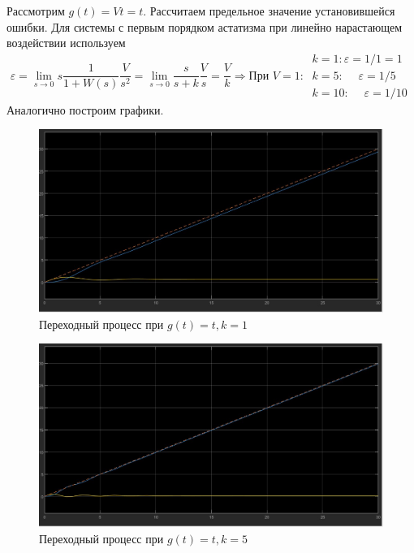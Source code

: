 \documentclass[a4paper, 12pt]{article}
\begin{document}
    Рассмотрим $g(t)=Vt=t$. Рассчитаем предельное значение установившейся ошибки.
    Для системы с первым порядком астатизма при линейно нарастающем воздействии используем
    $$\varepsilon=\lim\limits_{s\rightarrow0}s\dfrac{1}{1+W(s)}\dfrac{V}{s^2}=\lim\limits_{s\rightarrow0}\dfrac{s}{s+k}\dfrac{V}{s}=\dfrac{V}{k}
    \Rightarrow\text{При } V=1:\ \begin{matrix}
        k=1:\varepsilon=1/1=1\\
        k=5:\ \ \ \ \ \,\varepsilon=1/5\\
        k=10:\ \ \ \ \ \,\varepsilon=1/10
    \end{matrix}$$
    Аналогично построим графики.
    \begin{figure}[H]
        \centering
        \includegraphics[scale=0.3]{task_2_g=t_k=1.jpg}
        \captionsetup{skip=0pt}
        \caption{Переходный процесс при $g(t)=t,k=1$}
        \label{fig:t2gtk1}
    \end{figure}
    \begin{figure}[H]
        \centering
        \includegraphics[scale=0.3]{task_2_g=t_k=5.jpg}
        \captionsetup{skip=0pt}
        \caption{Переходный процесс при $g(t)=t,k=5$}
        \label{fig:t2gtk5}
    \end{figure}
\end{document}
